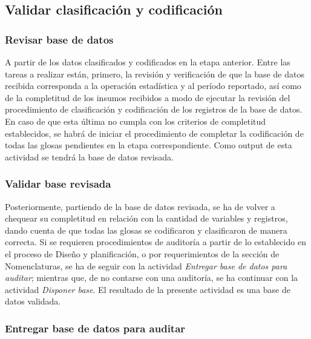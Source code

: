\documentclass[
]{article}
\begin{document}
\hypertarget{validar-clasificaciuxf3n-y-codificaciuxf3n}{%
\subsection{Validar clasificación y codificación}\label{validar-clasificaciuxf3n-y-codificaciuxf3n}}

\hypertarget{revisar-base-de-datos-1}{%
\subsubsection{Revisar base de datos}\label{revisar-base-de-datos-1}}

A partir de los datos clasificados y codificados en la etapa anterior. Entre las tareas a realizar están, primero, la revisión y verificación de que la base de datos recibida corresponda a la operación estadística y al período reportado, así como de la completitud de los insumos recibidos a modo de ejecutar la revisión del procedimiento de clasificación y codificación de los registros de la base de datos. En caso de que esta última no cumpla con los criterios de completitud establecidos, se habrá de iniciar el procedimiento de completar la codificación de todas las glosas pendientes en la etapa correspondiente. Como output de esta actividad se tendrá la base de datos revisada.

\hypertarget{validar-base-revisada}{%
\subsubsection{Validar base revisada}\label{validar-base-revisada}}

Posteriormente, partiendo de la base de datos revisada, se ha de volver a chequear su completitud en relación con la cantidad de variables y registros, dando cuenta de que todas las glosas se codificaron y clasificaron de manera correcta. Si se requieren procedimientos de auditoría a partir de lo establecido en el proceso de Diseño y planificación, o por requerimientos de la sección de Nomenclaturas, se ha de seguir con la actividad \emph{Entregar base de datos para auditar}; mientras que, de no contarse con una auditoría, se ha continuar con la actividad \emph{Disponer base}. El resultado de la presente actividad es una base de datos validada.

\hypertarget{entregar-base-de-datos-para-auditar}{%
\subsubsection{Entregar base de datos para auditar}\label{entregar-base-de-datos-para-auditar}}
\end{document}
